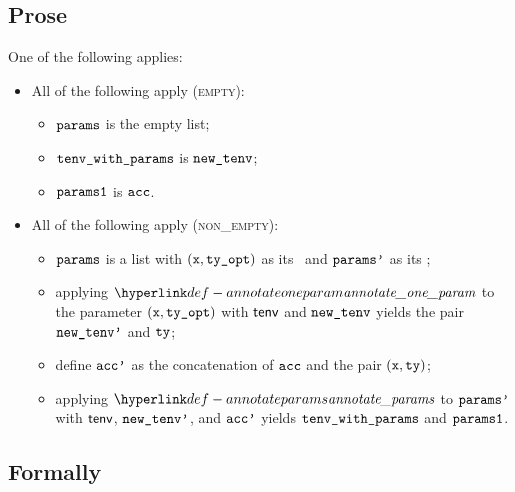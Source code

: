 \subsection{Prose}
One of the following applies:
\begin{itemize}
  \item All of the following apply (\textsc{empty}):
  \begin{itemize}
    \item $\texttt{params}$ is the empty list;
    \item $\texttt{tenv\_with\_params}$ is $\texttt{new\_tenv}$;
    \item $\texttt{params1}$ is $\texttt{acc}$.
  \end{itemize}

  \item All of the following apply (\textsc{non\_empty}):
  \begin{itemize}
    \item $\texttt{params}$ is a list with $(\texttt{x}, \texttt{ty\_opt})$ as its \head\ and $\texttt{params'}$ as its \tail;
    \item applying $\annotateoneparam$ to the parameter $(\texttt{x}, \texttt{ty\_opt})$ with $\textsf{tenv}$ and $\texttt{new\_tenv}$ yields the pair $\texttt{new\_tenv'}$ and $\texttt{ty}$\ProseOrTypeError;
    \item define $\texttt{acc'}$ as the concatenation of $\texttt{acc}$ and the pair $(\texttt{x}, \texttt{ty})$;
    \item applying $\annotateparams$ to $\texttt{params'}$ with $\textsf{tenv}$, $\texttt{new\_tenv'}$, and $\texttt{acc'}$ yields $\texttt{tenv\_with\_params}$ and $\texttt{params1}$.
  \end{itemize}
\end{itemize}

\subsection{Formally}

